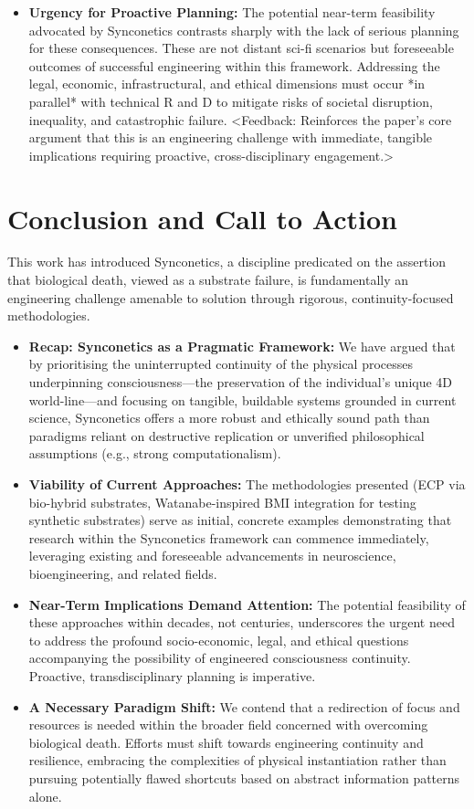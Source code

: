 \documentclass[10pt]{article}
\begin{document}
\begin{sloppypar}
\begin{itemize}
    \item \textbf{Urgency for Proactive Planning:} The potential near-term feasibility advocated by Synconetics contrasts sharply with the lack of serious planning for these consequences. These are not distant sci-fi scenarios but foreseeable outcomes of successful engineering within this framework. Addressing the legal, economic, infrastructural, and ethical dimensions must occur *in parallel* with technical R and D to mitigate risks of societal disruption, inequality, and catastrophic failure. <Feedback: Reinforces the paper's core argument that this is an engineering challenge with immediate, tangible implications requiring proactive, cross-disciplinary engagement.>

  \end{itemize}

  \section{Conclusion and Call to Action}
  \label{sec:conclusion}

  This work has introduced Synconetics, a discipline predicated on the assertion that biological death, viewed as a substrate failure, is fundamentally an engineering challenge amenable to solution through rigorous, continuity-focused methodologies.

  \begin{itemize}
    \item \textbf{Recap: Synconetics as a Pragmatic Framework:} We have argued that by prioritising the uninterrupted continuity of the physical processes underpinning consciousness—the preservation of the individual's unique 4D world-line—and focusing on tangible, buildable systems grounded in current science, Synconetics offers a more robust and ethically sound path than paradigms reliant on destructive replication or unverified philosophical assumptions (e.g., strong computationalism).
    \item \textbf{Viability of Current Approaches:} The methodologies presented (ECP via bio-hybrid substrates, Watanabe-inspired BMI integration for testing synthetic substrates) serve as initial, concrete examples demonstrating that research within the Synconetics framework can commence immediately, leveraging existing and foreseeable advancements in neuroscience, bioengineering, and related fields.
    \item \textbf{Near-Term Implications Demand Attention:} The potential feasibility of these approaches within decades, not centuries, underscores the urgent need to address the profound socio-economic, legal, and ethical questions accompanying the possibility of engineered consciousness continuity. Proactive, transdisciplinary planning is imperative.
    \item \textbf{A Necessary Paradigm Shift:} We contend that a redirection of focus and resources is needed within the broader field concerned with overcoming biological death. Efforts must shift towards engineering continuity and resilience, embracing the complexities of physical instantiation rather than pursuing potentially flawed shortcuts based on abstract information patterns alone.


\end{itemize}
\end{sloppypar}
\end{document}
